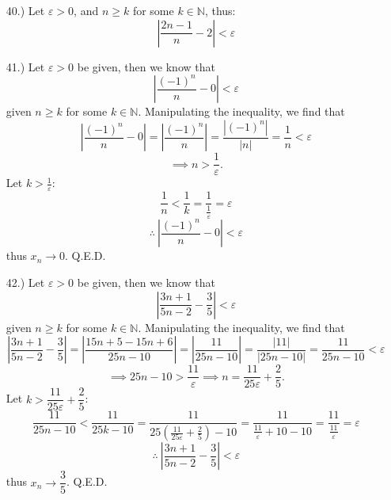 \documentclass[12pt]{article}
\newcommand{\vertb}[1]{\left\vert#1\right\vert}
\newcommand{\parns}[1]{\left(#1\right)}
\newcommand{\e}{\varepsilon}
\begin{document}
\begin{itemize}
    \item [40.)] Let $\varepsilon>0$, and $n\geq k$ for some $k\in\mathbb{N}$, thus:
    \[\vertb{\frac{2n-1}{n}-2}<\varepsilon\]

    \item [41.)] Let $\e>0$ be given, then we know that
    \[\vertb{\frac{(-1)^n}{n}-0}<\e\]
    given $n\geq k$ for some $k\in\mathbb{N}$. Manipulating the inequality, we find that
    \[\vertb{\frac{(-1)^n}{n}-0}=\vertb{\frac{(-1)^n}{n}}=\frac{\vertb{(-1)^n}}{\vertb{n}}=\frac{1}{n}<\e\]
    \[\implies n>\frac{1}{\e}.\]
    Let $k>\frac{1}{\e}$:
    \[\frac{1}{n}<\frac{1}{k}=\frac{1}{\frac{1}{\e}}=\e\]
    \[\therefore\ \vertb{\frac{(-1)^n}{n}-0}<\e\]
    thus $x_n\to0$. Q.E.D.

    \pagebreak
    \item [42.)] Let $\e>0$ be given, then we know that
    \[\vertb{\frac{3n+1}{5n-2}-\frac{3}{5}}<\e\]
    given $n\geq k$ for some $k\in\mathbb{N}$. Manipulating the inequality, we find that
    \[\vertb{\frac{3n+1}{5n-2}-\frac{3}{5}}=\vertb{\frac{15n+5-15n+6}{25n-10}}=\vertb{\frac{11}{25n-10}}=\frac{\vertb{11}}{\vertb{25n-10}}=\frac{11}{25n-10}<\e\]
    \[\implies 25n-10>\frac{11}{\e}\implies n=\frac{11}{25\e}+\frac{2}{5}.\]
    Let $k>\dfrac{11}{25\e}+\dfrac{2}{5}$:
    \[\frac{11}{25n-10}<\frac{11}{25k-10}=\frac{11}{25\parns{\frac{11}{25\e}+\frac{2}{5}}-10}=\frac{11}{\frac{11}{\e}+10-10}=\frac{11}{\frac{11}{\e}}=\e\]
    \[\therefore\ \vertb{\frac{3n+1}{5n-2}-\frac{3}{5}}<\e\]
    thus $x_n\to\dfrac{3}{5}$. Q.E.D.









\end{itemize}
\end{document}
